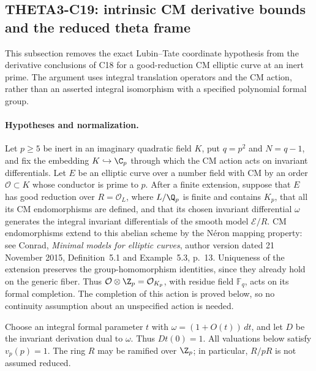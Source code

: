 \subsection{THETA3-C19: intrinsic CM derivative bounds and the reduced theta frame}\label{C19}

This subsection removes the exact Lubin--Tate coordinate hypothesis
from the derivative conclusions of C18 for a good-reduction CM
elliptic curve at an inert prime.  The argument uses integral
translation operators and the CM action, rather than an asserted
integral isomorphism with a specified polynomial formal group.

\paragraph{Hypotheses and normalization.}
Let $p\geq5$ be inert in an imaginary quadratic field $K$, put
$q=p^2$ and $N=q-1$, and fix the embedding $K\hookrightarrow\C_p$
through which the CM action acts on invariant differentials.
Let $E$ be an elliptic curve over a number field with CM by an order
$\mathcal O\subset K$ whose conductor is prime to $p$.
After a finite extension, suppose that $E$ has good reduction over
$R=\mathcal O_L$, where $L/\Q_p$ is finite and contains $K_p$,
that all its CM endomorphisms are defined, and that its chosen
invariant differential $\omega$ generates the integral invariant
differentials of the smooth model $\mathcal E/R$.
CM endomorphisms extend to this abelian scheme by the N\'eron
mapping property: see Conrad, \emph{Minimal models for elliptic
curves}, author version dated 21 November 2015,
Definition~5.1 and Example~5.3, p.~13.
Uniqueness of the extension preserves the group-homomorphism
identities, since they already hold on the generic fiber.  Thus
$\mathcal O\otimes\Z_p=\mathcal O_{K_p}$, with residue field
$\mathbb F_q$, acts on its formal completion.
The completion of this action is proved below, so no continuity
assumption about an unspecified action is needed.

Choose an integral formal parameter $t$ with
$\omega=(1+O(t))\,dt$, and let $D$ be the invariant derivation dual
to $\omega$.  Thus $Dt(0)=1$.  All valuations below satisfy
$v_p(p)=1$.  The ring $R$ may be ramified over $\Z_p$; in
particular, $R/pR$ is not assumed reduced.

